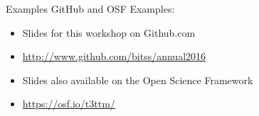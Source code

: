 \documentclass{beamer}
\begin{document}
{    \begin{frame}[plain]
     \end{frame}
}
\begin{frame}{Examples}
GitHub and OSF Examples:
\begin{itemize}
\item
Slides for this workshop on Github.com
\item \url{http://www.github.com/bitss/annual2016}
\item
Slides also available on the Open Science Framework
 \item \url{https://osf.io/t3ttm/}
\end{itemize}
\end{frame}
\end{document}

